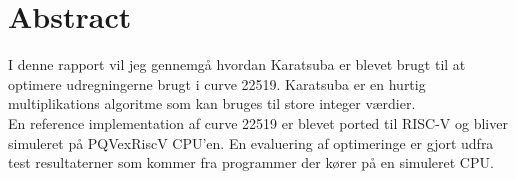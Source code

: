 \section{Abstract}
I denne rapport vil jeg gennemgå hvordan Karatsuba er blevet brugt til at optimere udregningerne brugt i curve 22519. Karatsuba er en hurtig multiplikations algoritme som kan bruges til store integer værdier.\\En reference implementation af curve 22519 er blevet ported til RISC-V og bliver simuleret på PQVexRiscV CPU'en. En evaluering af optimeringe er gjort udfra test resultaterner som kommer fra programmer der kører på en simuleret CPU.